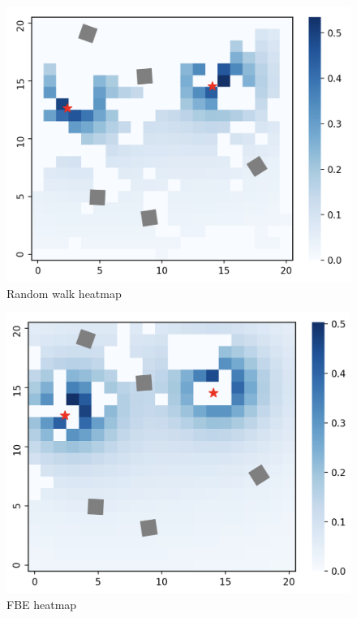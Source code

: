 \begin{figure}
    \includegraphics[width=16cm]{figures/dora_explorer/heatmap_random.png}
    \caption{Random walk heatmap}
    \label{results:belieffrontier}
\end{figure}

\begin{figure}
    \includegraphics[width=16cm]{figures/dora_explorer/heatmap_frontier.png}
    \caption{\ac{FBE} heatmap}
    \label{results:beliefrandom}
\end{figure}

